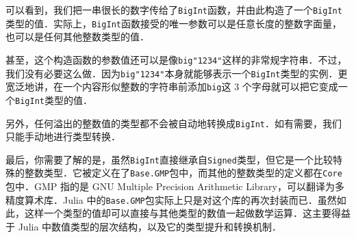 可以看到，我们把一串很长的数字传给了\verb|BigInt|函数，并由此构造了一个\verb|BigInt|类型的值．实际上，\verb|BigInt|函数接受的唯一参数可以是任意长度的整数字面量，也可以是任何其他整数类型的值．

甚至，这个构造函数的参数值还可以是像\verb|big"1234"|这样的非常规字符串．不过，我们没有必要这么做．因为\verb|big"1234"|本身就能够表示一个\verb|BigInt|类型的实例．更宽泛地讲，在一个内容形似整数的字符串前添加\verb|big|这 3 个字母就可以把它变成一个\verb|BigInt|类型的值．

另外，任何溢出的整数值的类型都不会被自动地转换成\verb|BigInt|．如有需要，我们只能手动地进行类型转换．

最后，你需要了解的是，虽然\verb|BigInt|直接继承自\verb|Signed|类型，但它是一个比较特殊的整数类型．它被定义在了\verb|Base.GMP|包中，而其他的整数类型的定义都在\verb|Core|包中．GMP 指的是 GNU Multiple Precision Arithmetic Library，可以翻译为多精度算术库．Julia 中的\verb|Base.GMP|包实际上只是对这个库的再次封装而已．虽然如此，这样一个类型的值却可以直接与其他类型的数值一起做数学运算．这主要得益于 Julia 中数值类型的层次结构，以及它的类型提升和转换机制．